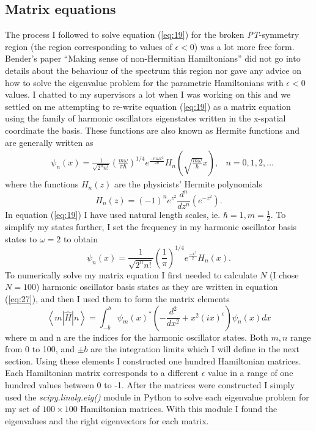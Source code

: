 \documentclass[10pt, a4paper, singlespacing, headsepline]{report}
\newcommand\PT{\emph{PT}}
\begin{document}
\subsection{Matrix equations}\label{Matrix equations}
The process I followed to solve equation (\ref{eq:19}) for the broken \PT-symmetry region (the region corresponding to values of $\epsilon < 0$) was a lot more free form. Bender's paper ``Making sense of non-Hermitian Hamiltonians'' did not go into details about the behaviour of the spectrum this region nor gave any advice on how to solve the eigenvalue problem for the parametric Hamiltonians with $\epsilon < 0$ values. I chatted to my supervisors a lot when I was working on this and we settled on me attempting to re-write equation (\ref{eq:19}) as a matrix equation using the family of harmonic oscillators eigenstates written in the x-spatial coordinate the basis. These functions are also known as Hermite functions and are generally written as
\begin{align} \label{eq:25}
&\psi_n(x)= \frac{1}{\sqrt{2^n n!}} 
\left ( \frac{m \omega}{\pi \hbar}\right )^{1/4} e^{\frac{-m \omega x^2}{2 \hbar}}
H_n \left (\sqrt{\frac{m \omega}{\hbar}}x\right ),  &n = 0, 1, 2, \dots
\end{align}
where the functions $H_n(z)$ are the physicists' Hermite polynomials
\begin{equation} \label{eq:26}
H_n(z) = (-1)^n e^{z^2} \frac{d^n}{dz^n}\left( e^{-z^2}\right).
\end{equation}
In equation (\ref{eq:19}) I have used natural length scales, ie. $\hbar = 1, m = \frac{1}{2}$. To simplify my states further, I set the frequency in my harmonic oscillator basis states to $\omega = 2$ to obtain
\begin{equation} \label{eq:27}
\psi_n(x)= \frac{1}{\sqrt{2^n n!}} 
\left ( \frac{1}{\pi}\right )^{1/4} e^{\frac{-x^2}{2}}
H_n (x).
\end{equation}
To numerically solve my matrix equation I first needed to calculate $N$ (I chose $N = 100$) harmonic oscillator basis states as they are written in equation (\ref{eq:27}), and then I used them to form the matrix elements 
\begin{equation}\label{eq:28}
\left \langle m \left |\hat{H} \right|n \right \rangle = \int_{-b}^{b} \psi_m(x)^* \left (  - \frac{d^2}{dx^2} + x^2(ix)^{\epsilon}\right ) \psi_n(x) dx
\end{equation}
where m and n are the indices for the harmonic oscillator states. Both $m, n$ range from 0 to 100, and $\pm b$ are the integration limits which I will define in the next section. Using these elements I constructed one hundred Hamiltonian matrices. Each Hamiltonian matrix corresponds to a different $\epsilon$ value in a range of one hundred values between 0 to -1. 
After the matrices were constructed I simply used the \emph{scipy.linalg.eig()} module in Python to solve each eigenvalue problem for my set of $100\times100$ Hamiltonian matrices. With this module I found the eigenvalues and the right eigenvectors for each matrix.
\end{document}
